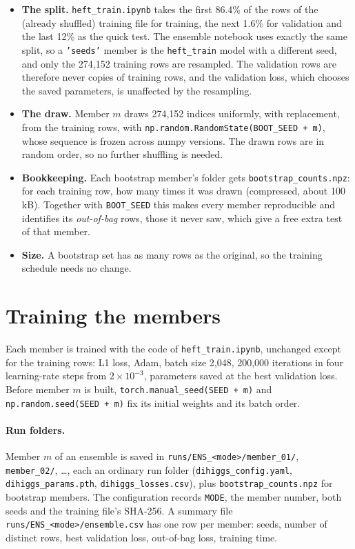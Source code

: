 \documentclass[11pt]{article}
\newcommand{\file}[1]{\nolinkurl{#1}}
\newcommand{\code}[1]{\texttt{#1}}
\begin{document}
\begin{itemize}
  \item \textbf{The split.} \file{heft_train.ipynb} takes the first 86.4\% of the rows of
    the (already shuffled) training file for training, the next 1.6\% for validation and
    the last 12\% as the quick test. The ensemble notebook uses exactly the same split, so
    a \code{'seeds'} member is the \file{heft_train} model with a different seed, and only
    the 274,152 training rows are resampled. The validation rows are therefore never
    copies of training rows, and the validation loss, which chooses the saved parameters,
    is unaffected by the resampling.
  \item \textbf{The draw.} Member $m$ draws 274,152 indices uniformly, with replacement,
    from the training rows, with \code{np.random.RandomState(BOOT\_SEED + m)}, whose
    sequence is frozen across numpy versions. The drawn rows are in random order, so no
    further shuffling is needed.
  \item \textbf{Bookkeeping.} Each bootstrap member's folder gets
    \file{bootstrap_counts.npz}: for each training row, how many times it was drawn
    (compressed, about 100 kB). Together with \code{BOOT\_SEED} this makes every member
    reproducible and identifies its \emph{out-of-bag} rows, those it never saw, which
    give a free extra test of that member.
  \item \textbf{Size.} A bootstrap set has as many rows as the original, so the training
    schedule needs no change.
\end{itemize}

\section{Training the members}
\label{sec:train}

Each member is trained with the code of \file{heft_train.ipynb}, unchanged except for the
training rows: L1 loss, Adam, batch size 2,048, 200,000 iterations in four learning-rate
steps from $2 \times 10^{-3}$, parameters saved at the best validation loss. Before member
$m$ is built, \code{torch.manual\_seed(SEED + m)} and \code{np.random.seed(SEED + m)} fix
its initial weights and its batch order.

\paragraph{Run folders.} Member $m$ of an ensemble is saved in
\file{runs/ENS_<mode>/member_01/}, \file{member_02/}, \ldots, each an ordinary run folder
(\file{dihiggs_config.yaml}, \file{dihiggs_params.pth}, \file{dihiggs_losses.csv}), plus
\file{bootstrap_counts.npz} for bootstrap members. The configuration records \code{MODE},
the member number, both seeds and the training file's SHA-256. A summary file
\file{runs/ENS_<mode>/ensemble.csv} has one row per member: seeds, number of distinct
rows, best validation loss, out-of-bag loss, training time.
\end{document}
